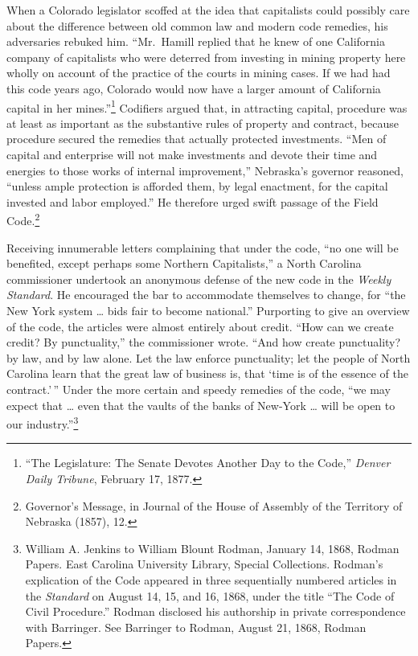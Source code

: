 \documentclass[12pt,]{article}
\let\rmarkdownfootnote\footnote%
\def\footnote{\protect\rmarkdownfootnote}
\begin{document}
When a Colorado legislator scoffed at the idea that capitalists could
possibly care about the difference between old common law and modern
code remedies, his adversaries rebuked him. ``Mr.~Hamill replied that he
knew of one California company of capitalists who were deterred from
investing in mining property here wholly on account of the practice of
the courts in mining cases. If we had had this code years ago, Colorado
would now have a larger amount of California capital in her
mines.''\footnote{``The Legislature: The Senate Devotes Another Day to
  the Code,'' \emph{Denver Daily Tribune}, February 17, 1877.} Codifiers
argued that, in attracting capital, procedure was at least as important
as the substantive rules of property and contract, because procedure
secured the remedies that actually protected investments. ``Men of
capital and enterprise will not make investments and devote their time
and energies to those works of internal improvement,'' Nebraska's
governor reasoned, ``unless ample protection is afforded them, by legal
enactment, for the capital invested and labor employed.'' He therefore
urged swift passage of the Field Code.\footnote{Governor's Message, in
  Journal of the House of Assembly of the Territory of Nebraska (1857),
  12.}

Receiving innumerable letters complaining that under the code, ``no one
will be benefited, except perhaps some Northern Capitalists,'' a North
Carolina commissioner undertook an anonymous defense of the new code in
the \emph{Weekly Standard}. He encouraged the bar to accommodate
themselves to change, for ``the New York system \ldots{} bids fair to
become national.'' Purporting to give an overview of the code, the
articles were almost entirely about credit. ``How can we create credit?
By punctuality,'' the commissioner wrote. ``And how create punctuality?
by law, and by law alone. Let the law enforce punctuality; let the
people of North Carolina learn that the great law of business is, that
`time is of the essence of the contract.'\,'' Under the more certain and
speedy remedies of the code, ``we may expect that \ldots{} even that the
vaults of the banks of New-York \ldots{} will be open to our
industry.''\footnote{William A. Jenkins to William Blount Rodman,
  January 14, 1868, Rodman Papers. East Carolina University Library,
  Special Collections. Rodman's explication of the Code appeared in
  three sequentially numbered articles in the \emph{Standard} on August
  14, 15, and 16, 1868, under the title ``The Code of Civil Procedure.''
  Rodman disclosed his authorship in private correspondence with
  Barringer. See Barringer to Rodman, August 21, 1868, Rodman Papers.}
\end{document}
